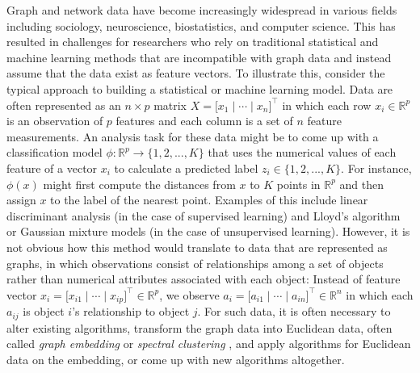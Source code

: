 \documentclass[
  12pt,
]{article}
\theoremstyle{definition}
\theoremstyle{definition}
\theoremstyle{definition}
\theoremstyle{definition}
\theoremstyle{remark}
\begin{document}
Graph and network data have become increasingly widespread in various fields including sociology, neuroscience, biostatistics, and computer science.
This has resulted in challenges for researchers who rely on traditional statistical and machine learning methods that are incompatible with graph data and instead assume that the data exist as feature vectors.
To illustrate this, consider the typical approach to building a statistical or machine learning model.
Data are often represented as an \(n \times p\) matrix \(X = \Big[ x_1 \mid \cdots \mid x_n \Big]^\top\) in which each row \(x_i \in \mathbb{R}^p\) is an observation of \(p\) features and each column is a set of \(n\) feature measurements.
An analysis task for these data might be to come up with a classification model \(\phi : \mathbb{R}^p \to \{1, 2, ..., K\}\) that uses the numerical values of each feature of a vector \(x_i\) to calculate a predicted label \(z_i \in \{1, 2, ..., K\}\).
For instance, \(\phi(x)\) might first compute the distances from \(x\) to \(K\) points in \(\mathbb{R}^p\) and then assign \(x\) to the label of the nearest point.
Examples of this include linear discriminant analysis (in the case of supervised learning) and Lloyd's algorithm \citep{1056489} or Gaussian mixture models \citep{doi:10.1198/016214502760047131} (in the case of unsupervised learning).
However, it is not obvious how this method would translate to data that are represented as graphs, in which observations consist of relationships among a set of objects rather than numerical attributes associated with each object:
Instead of feature vector \(x_i = \Big[ x_{i1} \mid \cdots \mid x_{ip} \Big]^\top \in \mathbb{R}^p\), we observe \(a_i = \Big[ a_{i1} \mid \cdots \mid a_{in} \Big]^\top \in \mathbb{R}^n\) in which each \(a_{ij}\) is object \(i\)'s relationship to object \(j\).
For such data, it is often necessary to alter existing algorithms, transform the graph data into Euclidean data, often called \emph{graph embedding} or \emph{spectral clustering} \citep{vonLuxburg2007}, and apply algorithms for Euclidean data on the embedding, or come up with new algorithms altogether.
\end{document}

